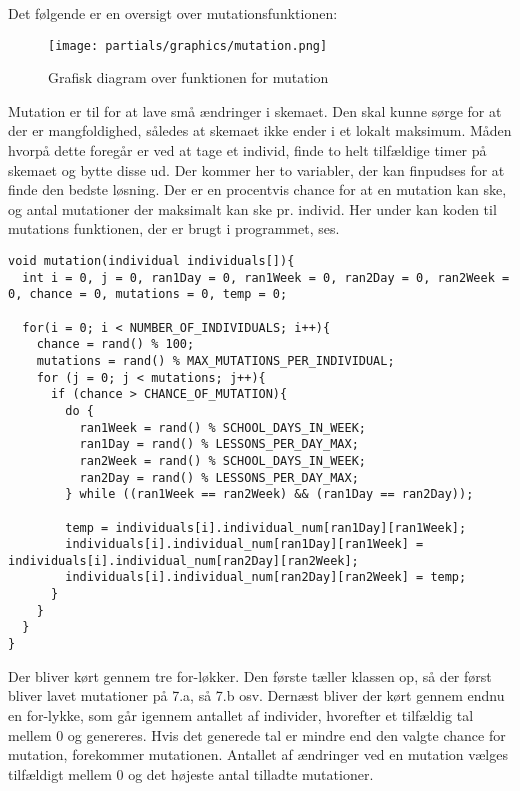 Det følgende er en oversigt over mutationsfunktionen:
\begin{figure}[!h]
\texttt{[image: partials/graphics/mutation.png]}
\caption{Grafisk diagram over funktionen for mutation}
\label{fig:diagrammutation}
\end{figure}

Mutation er til for at lave små ændringer i skemaet. Den skal kunne sørge for at der er mangfoldighed, således at skemaet ikke ender i et lokalt maksimum. 
Måden hvorpå dette foregår er ved at tage et individ, finde to helt tilfældige timer på skemaet og bytte disse ud. Der kommer her to variabler, der kan finpudses for at finde den bedste løsning. Der er en procentvis chance for at en mutation kan ske, og antal mutationer der maksimalt kan ske pr. individ. 
Her under kan koden til mutations funktionen, der er brugt i programmet, ses.
\begin{lstlisting}
void mutation(individual individuals[]){
  int i = 0, j = 0, ran1Day = 0, ran1Week = 0, ran2Day = 0, ran2Week = 0, chance = 0, mutations = 0, temp = 0;

  for(i = 0; i < NUMBER_OF_INDIVIDUALS; i++){
    chance = rand() % 100;
    mutations = rand() % MAX_MUTATIONS_PER_INDIVIDUAL;
    for (j = 0; j < mutations; j++){
      if (chance > CHANCE_OF_MUTATION){
        do {
          ran1Week = rand() % SCHOOL_DAYS_IN_WEEK;
          ran1Day = rand() % LESSONS_PER_DAY_MAX;
          ran2Week = rand() % SCHOOL_DAYS_IN_WEEK;
          ran2Day = rand() % LESSONS_PER_DAY_MAX;
        } while ((ran1Week == ran2Week) && (ran1Day == ran2Day));
        
        temp = individuals[i].individual_num[ran1Day][ran1Week];
        individuals[i].individual_num[ran1Day][ran1Week] =        individuals[i].individual_num[ran2Day][ran2Week];
        individuals[i].individual_num[ran2Day][ran2Week] = temp;
      }
    }
  }
}
\end{lstlisting}

Der bliver kørt gennem tre for-løkker. Den første tæller klassen op, så der først bliver lavet mutationer på 7.a, så 7.b osv. Dernæst bliver der kørt gennem endnu en for-lykke, som går igennem antallet af individer, hvorefter et tilfældig tal mellem 0 og genereres. Hvis det generede tal er mindre end den valgte chance for mutation, forekommer mutationen. Antallet af ændringer ved en mutation vælges tilfældigt mellem 0 og det højeste antal tilladte mutationer. 